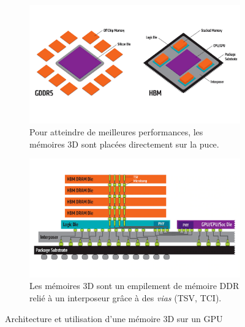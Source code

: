         \begin{figure}[t!]
            \centering
            \begin{subfigure}[t]{0.48\textwidth}
                \centering
                \includegraphics[width=\linewidth]{images/edl_hbm_vs_gddr5.png}
                \caption{\label{fig:edl_hbm_vs_gddr5} Pour atteindre de meilleures performances, les mémoires 3D sont placées directement sur la puce.}
            \end{subfigure}\hfill
            \begin{subfigure}[t]{0.48\textwidth}
                \centering
                \includegraphics[width=\linewidth]{images/edl_hbm.png}
                \caption{\label{fig:edl_hbm_precis} Les mémoires 3D sont un empilement de mémoire DDR relié à un interposeur grâce à des \textit{vias} (TSV, TCI).}
            \end{subfigure}
            \caption{\label{fig:edl_hbm}Architecture et utilisation d'une mémoire 3D sur un GPU\protect\footnotemark}
        \end{figure}
        
